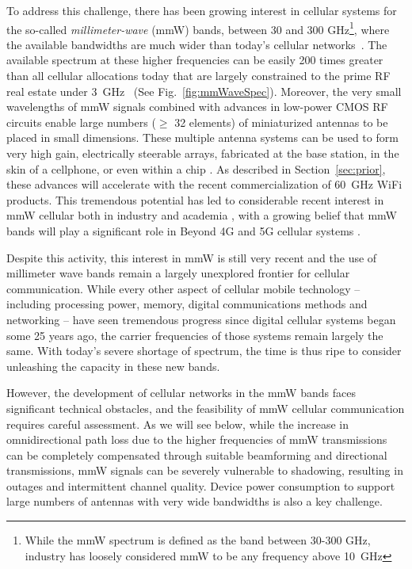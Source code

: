 \documentclass[journal]{IEEEtran}
\begin{document}
To address this challenge, there has been growing interest in
cellular systems for the so-called \emph{millimeter-wave} (mmW) bands,
between 30 and 300 GHz\footnote{While the mmW spectrum is defined
as the band between 30-300 GHz, industry has loosely considered mmW to be any
frequency above 10~GHz}, where the available bandwidths are much wider than today's
cellular networks~\cite{KhanPi:11,KhanPi:11-CommMag,Ted:60Gstate11,PietBRPC:12}.
The available spectrum at these higher frequencies can be easily 200 times
greater than all cellular allocations today that are largely constrained
to the
prime RF real estate under 3~GHz~\cite{Ted:60Gstate11,KhanPi:11-CommMag}
(See Fig.~\ref{fig:mmWaveSpec}).
Moreover, the very small wavelengths of mmW signals combined with advances
in low-power CMOS RF
circuits enable large numbers ($\geq$ 32 elements) of  miniaturized antennas
to be placed in small dimensions.  These multiple antenna systems
can be used to form very high gain, electrically steerable arrays,
fabricated at the base station, in the skin of a cellphone,
or even within a chip \cite{Doan:04,Doan:05,ZhaLiu:09,gutierrez2009chip,Nsenga:10,Ted:60Gstate11,Rajagopal:mmWMobile,Huang:2008:MWA:1524107,Rusek:13}.
As described in Section~\ref{sec:prior}, these advances will accelerate with the
recent commercialization of 60~GHz WiFi products.
This tremendous potential has led to considerable recent interest in mmW cellular
both in industry
\cite{KhanPi:11,KhanPi:11-CommMag,PietBRPC:12,hur2013millimeter,Samsung5G:13} and academia
\cite{fettweis2005wigwam,laskar2007next,AkoumAyaHeath:12,ZhangMadhow1,ZhangMadhow2,ZhangMadhow3,rappaportmillimeter},
with a growing belief that mmW bands will play a significant role in Beyond 4G and 5G cellular systems
\cite{BocHLMP:14}.


Despite this activity, this interest in mmW is still very recent and the use of
millimeter wave bands remain a largely unexplored frontier for cellular communication.
While every other aspect of cellular mobile technology -- including
processing power, memory, digital communications methods and networking --
have seen tremendous progress since digital cellular systems began some
25 years ago, the carrier frequencies
of those systems remain largely the same.  With today's severe shortage of spectrum, the time is thus ripe
to consider unleashing the capacity in these new bands.

However, the development of cellular networks in the mmW bands
faces significant technical obstacles, and the feasibility of mmW cellular
communication requires careful assessment.
As we will see below,  while the increase in omnidirectional
path loss due to the higher frequencies of mmW transmissions
can be completely compensated through suitable beamforming and directional transmissions, mmW signals
can be severely vulnerable to shadowing, resulting in outages and
intermittent channel quality.
Device power consumption to support large numbers of antennas
with very wide bandwidths is also a key challenge.
\end{document}

